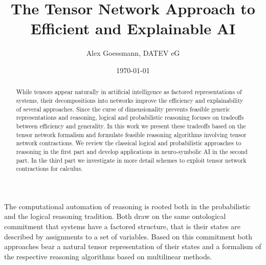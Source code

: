 \documentclass[aps,onecolumn,nofootinbib,pra]{article}
\begin{document}
    \title{The Tensor Network Approach to Efficient and Explainable AI}
    \author{Alex Goessmann, DATEV eG}

    \maketitle
    \date{\today}

    \begin{abstract}
        While tensors appear naturally in artificial intelligence as factored representations of systems, their decompositions into networks improve the efficiency and explainability of several approaches.
        Since the curse of dimensionality prevents feasible generic representations and reasoning, logical and probabilistic reasoning focuses on tradeoffs between efficiency and generality.
        In this work we present these tradeoffs based on the tensor network formalism and formulate feasible reasoning algorithms involving tensor network contractions.
        We review the classical logical and probabilistic approaches to reasoning in the first part and develop applications in neuro-symbolic AI in the second part.
        In the third part we investigate in more detail schemes to exploit tensor network contractions for calculus.
    \end{abstract}

    \tableofcontents

    
    
    

    \part{\partonetext}\label{par:one}

    The computational automation of reasoning is rooted both in the probabilistic and the logical reasoning tradition.
    Both draw on the same ontological commitment that systems have a factored structure, that is their states are described by assignments to a set of variables.
    Based on this commitment both approaches bear a natural tensor representation of their states and a formalism of the respective reasoning algorithms based on multilinear methods.

    
    

    
    
\end{document}
